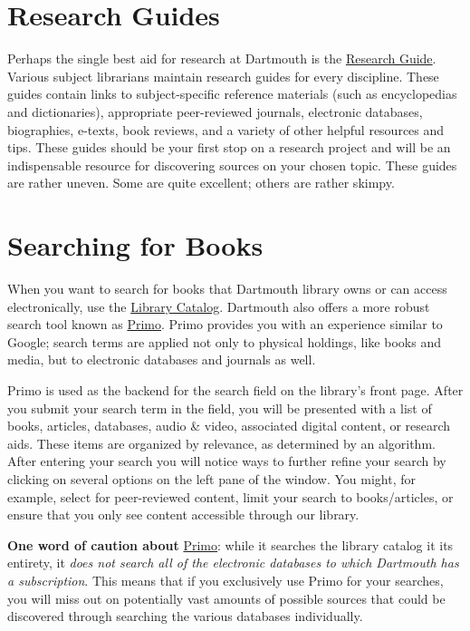 \section{Research Guides}

Perhaps the single best aid for research at Dartmouth is the
\href{http://researchguides.dartmouth.edu}{Research Guide}. Various subject
librarians maintain research guides for every discipline. These guides contain
links to subject-specific reference materials (such as encyclopedias and
dictionaries),  appropriate peer-reviewed journals, electronic databases,
biographies, e-texts, book reviews, and a variety of other helpful resources and
tips. These guides should be your first stop on a research project and will be
an indispensable resource for discovering sources on your chosen topic. These guides are rather uneven. Some are quite excellent; others are rather skimpy. 

\section{Searching for Books}

When you want to search for books that Dartmouth library owns or can access
electronically, use the \href{http://libcat.dartmouth.edu/}{Library Catalog}.
Dartmouth also offers a more robust search tool known as
\href{https://search.library.dartmouth.edu/}{Primo}. Primo provides
you with an experience similar to Google; search terms are applied not only to
physical holdings, like books and media, but to electronic databases and journals as well.

Primo is used as the backend for the search field on the library's front page. After you submit your
search term in the field, you will be presented with a list of books, articles, databases, audio \& video, associated digital content, or research aids. These items are organized by relevance, as determined by an algorithm. After entering your search you will notice ways to further refine your search by clicking on several options on the left pane of the window. You might, for example, select for peer-reviewed content, limit your search to books/articles, or ensure that you only see content accessible through our library.  

\begin{center}
\begin{tcolorbox}[colframe=oyster, coltitle=black, sharp corners, title=\ding{52} Note]
\textbf{One word of caution about}
\href{https://search.library.dartmouth.edu/}{Primo}: while
it searches the library catalog it its entirety, it \emph{does not search all of
the electronic databases to which Dartmouth has a subscription}. This means that
if you exclusively use Primo for your searches, you will miss out on potentially vast amounts of possible sources that could be discovered through searching the various databases individually.
\end{tcolorbox}
\end{center}


